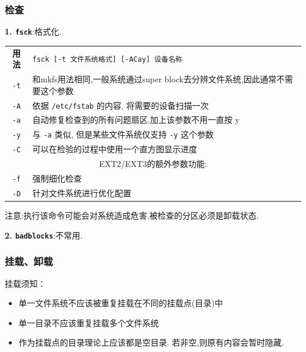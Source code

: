 \subsubsection{检查}
\textbf{1. \texttt{fsck}}:格式化.
\begin{longtable}{c@{: }p{}}\hline\hline

    \textbf{用法} & \verb"fsck [-t 文件系统格式] [-ACay] 设备名称"
    \\
    \texttt{-t} & 和mkfs用法相同,一般系统通过super block去分辨文件系统,因此通常不需要这个参数 \\

    \texttt{-A}  & 依据 \texttt{/etc/fstab} 的内容, 将需要的设备扫描一次  \\

    \texttt{-a} & 自动修复检查到的所有问题扇区,加上该参数不用一直按 y \\

    \texttt{-y} & 与 \texttt{-a} 类似, 但是某些文件系统仅支持 \texttt{-y} 这个参数 \\

    \texttt{-C} & 可以在检验的过程中使用一个直方图显示进度 \\

    \multicolumn{2}{p{\columnwidth}}{EXT2/EXT3的额外参数功能:} \\

    \texttt{-f} & 强制细化检查 \\

    \texttt{-D} & 针对文件系统进行优化配置 \\

    \hline
\end{longtable}
注意:执行该命令可能会对系统造成危害,被检查的分区必须是卸载状态.

\textbf{2. \texttt{badblocks}}:不常用.

\subsubsection{挂载、卸载}
挂载须知：
\begin{itemize}
    \item 单一文件系统不应该被重复挂载在不同的挂载点(目录)中

    \item 单一目录不应该重复挂载多个文件系统

    \item 作为挂载点的目录理论上应该都是空目录. 若非空,则原有内容会暂时隐藏.
\end{itemize}

